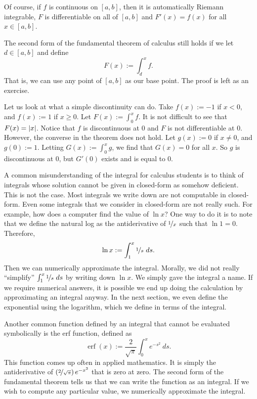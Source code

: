 Of course, if $f$ is continuous on $[a,b]$, then it is automatically Riemann
integrable, $F$ is differentiable on all of $[a,b]$ and $F'(x) = f(x)$ for
all $x \in [a,b]$.

\begin{remark} \label{remark:fundthmbase}
The second form of the fundamental theorem of calculus still holds if
we let $d \in [a,b]$ and define
\begin{equation*}
F(x) := \int_d^x f .
\end{equation*}
That is, we can use any point of $[a,b]$ as our base point.  The proof is
left as an exercise.
\end{remark}

Let us look at what a simple discontinuity can do.  Take $f(x) := -1$ if $x
< 0$, and $f(x) := 1$ if $x \geq 0$.  Let $F(x) := \int_0^x f$.  It is not
difficult to see that $F(x) = \left\lvert {x} \right\rvert$.  Notice that $f$ is discontinuous at
$0$ and $F$ is not differentiable at $0$.  However, the converse in the
theorem does not
hold.
Let $g(x) := 0$ if $x \not= 0$, and $g(0) := 1$.  Letting $G(x) :=
\int_0^x g$, we find that $G(x) = 0$ for all $x$.  So $g$ is discontinuous
at $0$, but $G'(0)$ exists and is equal to 0.

A common misunderstanding of the integral for calculus students is to
think of integrals whose solution cannot be given in closed-form as somehow
deficient.  This is not the case.  Most integrals we write down are not
computable in closed-form.  Even some integrals that we consider
in closed-form are not really such.  For example, how does a computer find
the value of $\ln x$?  One way to do it is to note that
we define the natural log as the antiderivative of $\nicefrac{1}{x}$
such that $\ln 1 = 0$.
Therefore,
\begin{equation*}
\ln x := \int_1^x \nicefrac{1}{s}~ds .
\end{equation*}
Then we can numerically approximate the integral.  Morally,
we did not really ``simplify'' $\int_1^x \nicefrac{1}{s}~ds$ by
writing down $\ln x$.  We simply gave the integral a name.
If we require numerical answers,
it is possible we end up doing
the calculation by approximating an integral anyway.
In the next section, we even define the exponential using
the logarithm, which we define in terms of the integral.

Another common function defined by an integral that cannot
be evaluated symbolically
is the erf function, defined as
\begin{equation*}
\operatorname{erf}(x) := \frac{2}{\sqrt{\pi}} \int_0^x e^{-s^2} ~ds .
\end{equation*}
This function comes up often in applied mathematics.  It is simply 
the antiderivative of $\left(\nicefrac{2}{\sqrt{\pi}}\right) e^{-x^2}$
that is zero at zero.
The second form of the fundamental theorem tells us that we can write the function
as an integral.  If we wish to compute any particular value, we 
numerically approximate the integral.

